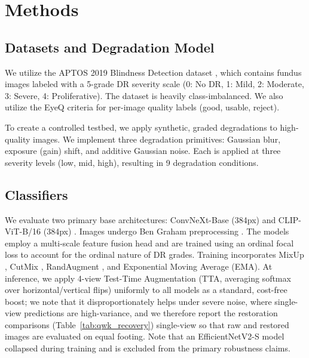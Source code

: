 \documentclass[runningheads]{llncs}
\begin{document}
\section{Methods}

\subsection{Datasets and Degradation Model}
We utilize the APTOS 2019 Blindness Detection dataset \cite{aptos2019}, which contains fundus images labeled with a 5-grade DR severity scale (0: No DR, 1: Mild, 2: Moderate, 3: Severe, 4: Proliferative). The dataset is heavily class-imbalanced. We also utilize the EyeQ \cite{fu2019eyeq} criteria for per-image quality labels (good, usable, reject).

To create a controlled testbed, we apply synthetic, graded degradations to high-quality images. We implement three degradation primitives: Gaussian blur, exposure (gain) shift, and additive Gaussian noise. Each is applied at three severity levels (low, mid, high), resulting in 9 degradation conditions.

\subsection{Classifiers}
We evaluate two primary base architectures: ConvNeXt-Base (384px) \cite{liu2022convnext} and CLIP-ViT-B/16 (384px) \cite{radford2021clip}. Images undergo Ben Graham preprocessing \cite{graham2015kaggle}. The models employ a multi-scale feature fusion head and are trained using an ordinal focal loss \cite{lin2017focal} to account for the ordinal nature of DR grades. Training incorporates MixUp \cite{zhang2018mixup}, CutMix \cite{yun2019cutmix}, RandAugment \cite{cubuk2020randaugment}, and Exponential Moving Average (EMA). At inference, we apply 4-view Test-Time Augmentation (TTA, averaging softmax over horizontal/vertical flips) uniformly to all models as a standard, cost-free boost; we note that it disproportionately helps under severe noise, where single-view predictions are high-variance, and we therefore report the restoration comparisons (Table~\ref{tab:qwk_recovery}) single-view so that raw and restored images are evaluated on equal footing. Note that an EfficientNetV2-S model collapsed during training and is excluded from the primary robustness claims.
\end{document}
